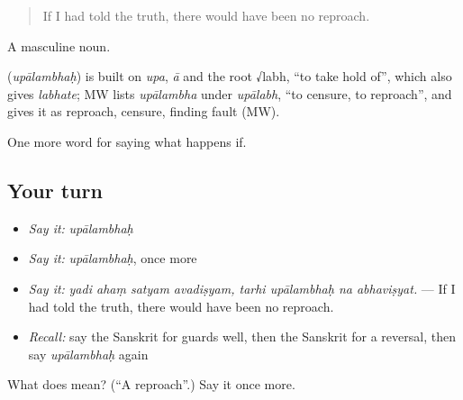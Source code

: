 \begin{quote}
If I had told the truth, there would have been no reproach.
\end{quote}

A masculine noun.

\begin{cousinweb}
\textbf{} (\emph{upālambhaḥ}) is built on \emph{upa}, \emph{ā} and the root √labh, \textquotedblleft{}to take hold of\textquotedblright{}, which also gives \emph{labhate}; MW lists \emph{upālambha} under \emph{upālabh}, \textquotedblleft{}to censure, to reproach\textquotedblright{}, and gives it as reproach, censure, finding fault (MW).
\end{cousinweb}

\begin{grammarlens}[title={What you've built}]
One more word for saying what happens if.
\end{grammarlens}

\subsection*{Your turn}
\begin{itemize}
\raggedright
  \item \emph{Say it:} \emph{upālambhaḥ}
  \item \emph{Say it:} \emph{upālambhaḥ}, once more
  \item \emph{Say it:} \emph{yadi ahaṃ satyam avadiṣyam, tarhi upālambhaḥ na abhaviṣyat.} — If I had told the truth, there would have been no reproach.
  \item \emph{Recall:} say the Sanskrit for guards well, then the Sanskrit for a reversal, then say \emph{upālambhaḥ} again
\end{itemize}

\begin{tcolorbox}[breakable,colback=teal!4,colframe=teal!35!black,title={Before you move on}]
What does  mean? (\textquotedblleft{}A reproach\textquotedblright{}.) Say it once more.
\end{tcolorbox}
